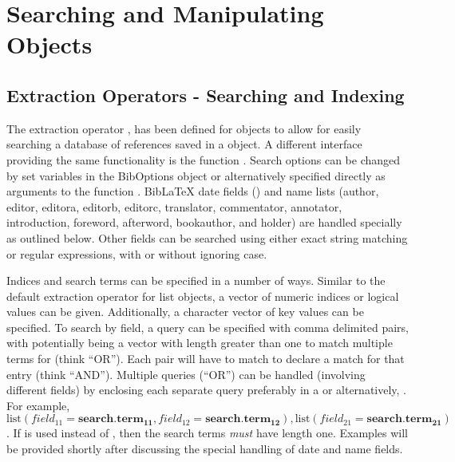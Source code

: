 \documentclass[article]{jss}\usepackage[]{graphicx}\usepackage[]{color}
\begin{document}
\section[Searching and Manipulating BibEntry Objects]{Searching and Manipulating  Objects}\label{sec_manip}
\subsection{Extraction Operators - Searching and Indexing}\label{searchsec}
The extraction operator \code{'['}, has been defined for  objects to allow for easily searching a database of references saved in a  object.  A different interface providing the same functionality is the function .  Search options can be changed by set variables in the BibOptions object or alternatively specified directly as arguments to the function .  BibLaTeX date fields () and name lists (author, editor, editora, editorb, editorc, translator, commentator, annotator, introduction, foreword, afterword, bookauthor, and holder) are handled specially as outlined below.  Other fields can be searched using either exact string matching or regular expressions, with or without ignoring case.

Indices and search terms can be specified in a number of ways.  Similar to the default extraction operator for list objects, a vector of numeric indices or logical values can be given.  Additionally, a character vector of key values can be specified.  To search by field, a query can be specified with comma delimited  pairs, with  potentially being a vector with length greater than one to match multiple terms for  (think ``OR'').  Each  pair will have to match to declare a match for that entry (think ``AND'').  Multiple queries (``OR'') can be handled (involving different fields) by enclosing each separate query preferably in a  or alternatively, .  For example, $\text{list}(field_{11} = \mathbf{search.term_{11}},field_{12}=\mathbf{search.term_{12}}),\text{list}(field_{21}=\mathbf{search.term_{21}})$.  If  is used instead of , then the search terms \emph{must} have length one.  Examples will be provided shortly after discussing the special handling of date and name fields.  
\end{document}

